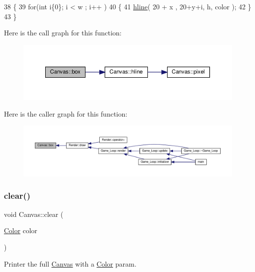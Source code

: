 \begin{DoxyCode}
38 \{
39     \textcolor{keywordflow}{for}(\textcolor{keywordtype}{int} i\{0\}; i < w ; i++ )
40     \{
41         \hyperlink{classCanvas_a3095d5ff2670c5dc9939454198865ceb}{hline}( 20 + x , 20+y+i, h, color );
42     \}
43 \}
\end{DoxyCode}
Here is the call graph for this function\+:\nopagebreak
\begin{figure}[H]
\begin{center}
\leavevmode
\includegraphics[width=350pt]{classCanvas_a6e1c6baa6fb92cd3de1726b67b51aa38_cgraph}
\end{center}
\end{figure}
Here is the caller graph for this function\+:\nopagebreak
\begin{figure}[H]
\begin{center}
\leavevmode
\includegraphics[width=350pt]{classCanvas_a6e1c6baa6fb92cd3de1726b67b51aa38_icgraph}
\end{center}
\end{figure}
\mbox{\label{classCanvas_a0205269b201aed71f21b8f613cd66333}} 
\subsubsection{\texorpdfstring{clear()}{clear()}}
{\footnotesize\ttfamily void Canvas\+::clear (\begin{DoxyParamCaption}\item[{\hyperlink{structColor}{Color}}]{color }\end{DoxyParamCaption})}



Printer the full \hyperlink{classCanvas}{Canvas} with a \hyperlink{structColor}{Color} param. 


